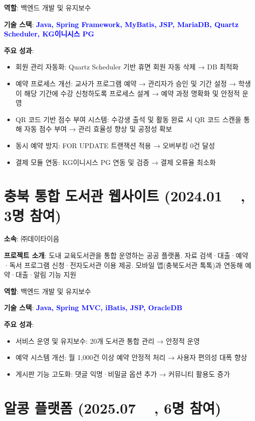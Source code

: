 \documentclass[a4paper,11pt]{article}
\newcommand{\tech}[1]{\textbf{\textcolor{blue}{#1}}}
\begin{document}
\textbf{역할}: 백엔드 개발 및 유지보수

\textbf{기술 스택}: \tech{Java, Spring Framework, MyBatis, JSP, MariaDB, Quartz Scheduler, KG이니시스 PG}

\textbf{주요 성과}:
\begin{itemize}[leftmargin=*]
  \item 회원 관리 자동화: Quartz Scheduler 기반 휴면 회원 자동 삭제 → DB 최적화
  \item 예약 프로세스 개선: 교사가 프로그램 예약 → 관리자가 승인 및 기간 설정 → 학생이 해당 기간에 수강 신청하도록 프로세스 설계 → 예약 과정 명확화 및 안정적 운영
  \item QR 코드 기반 점수 부여 시스템: 수강생 출석 및 활동 완료 시 QR 코드 스캔을 통해 자동 점수 부여 → 관리 효율성 향상 및 공정성 확보
  \item 동시 예약 방지: FOR UPDATE 트랜잭션 적용 → 오버부킹 0건 달성
  \item 결제 모듈 연동: KG이니시스 PG 연동 및 검증 → 결제 오류율 최소화
\end{itemize}

\section{충북 통합 도서관 웹사이트 (2024.01 ~ , 3명 참여)}

\textbf{소속}: ㈜데이타이음

\textbf{프로젝트 소개}:  
도내 교육도서관을 통합 운영하는 공공 플랫폼.  
자료 검색·대출·예약·독서 프로그램 신청·전자도서관 이용 제공.  
모바일 앱(충북도서관 톡톡)과 연동해 예약·대출·알림 기능 지원

\textbf{역할}: 백엔드 개발 및 유지보수

\textbf{기술 스택}: \tech{Java, Spring MVC, iBatis, JSP, OracleDB}

\textbf{주요 성과}:
\begin{itemize}[leftmargin=*]
  \item 서비스 운영 및 유지보수: 20개 도서관 통합 관리 → 안정적 운영
  \item 예약 시스템 개선: 월 1,000건 이상 예약 안정적 처리 → 사용자 편의성 대폭 향상
  \item 게시판 기능 고도화: 댓글 익명·비밀글 옵션 추가 → 커뮤니티 활용도 증가
\end{itemize}

\section{알콩 플랫폼 (2025.07 ~ , 6명 참여)}
\end{document}

